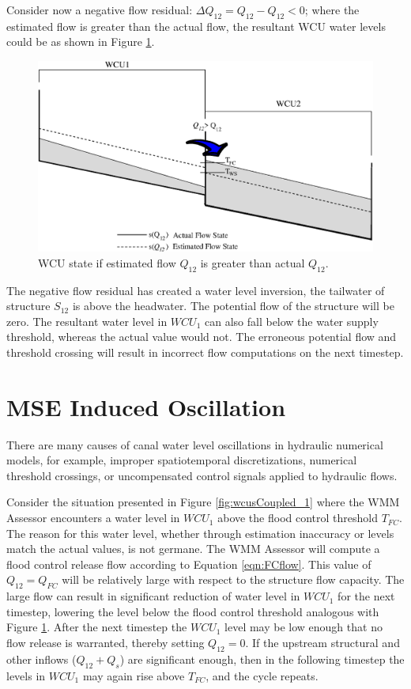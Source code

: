 Consider now a negative flow residual: $\Delta Q_{12} = Q_{12} -
Q_{12} < 0$; where the estimated flow is greater than the actual flow,
the resultant WCU water levels could be as shown in Figure \ref{fig:wcusCoupled_2}.

 \begin{figure}
 \begin{center}
  \includegraphics[scale=.33]{Graphics/wcusCoupled_2.eps}
 \end{center}
 \caption{\label{fig:wcusCoupled_2} WCU state if estimated flow $Q_{12}$ is greater than actual $Q_{12}$.}
\end{figure}

The negative flow residual has created a water level inversion, the
tailwater of structure $S_{12}$ is above the headwater. The potential
flow of the structure will be zero. The resultant water level in
$WCU_1$ can also fall below the water supply threshold, whereas the
actual value would not. The erroneous potential flow and threshold
crossing will result in incorrect flow computations on the next
timestep.

\section{MSE Induced Oscillation}
There are many causes of canal water level oscillations in hydraulic
numerical models, for example, improper spatiotemporal
discretizations, numerical threshold crossings, or uncompensated
control signals applied to hydraulic flows.

Consider the situation presented in Figure \ref{fig:wcusCoupled_1}
where the WMM Assessor encounters a water level in $WCU_1$ above the
flood control threshold $T_{FC}$. The reason for this water level,
whether through estimation inaccuracy or levels match the actual
values, is not germane. The WMM Assessor will compute a flood control
release flow according to Equation \ref{eqn:FCflow}. This value of
$Q_{12} = Q_{FC}$ will be relatively large with respect to the
structure flow capacity. The large flow can result in significant
reduction of water level in $WCU_1$ for the next timestep, lowering
the level below the flood control threshold analogous with Figure
\ref{fig:wcusCoupled_2}. After the next timestep the $WCU_1$ level may
be low enough that no flow release is warranted, thereby setting
$Q_{12} =0$. If the upstream structural and other inflows ($Q_{12} + Q_s$)
are significant enough, then in the following timestep the levels in
$WCU_1$ may again rise above $T_{FC}$, and the cycle repeats.

